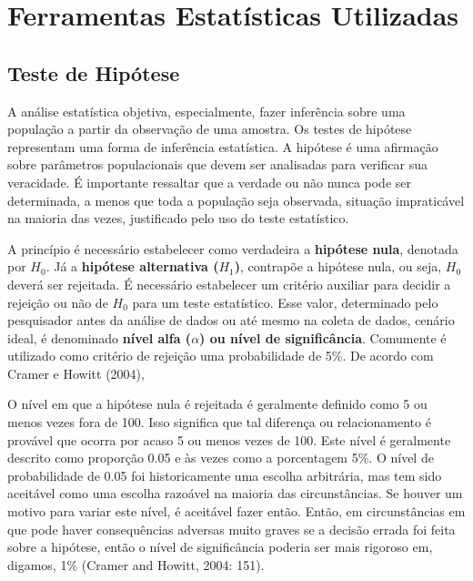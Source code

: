 \chapter{Ferramentas Estatísticas Utilizadas}
\section{Teste de Hipótese}
A análise estatística objetiva, especialmente, fazer inferência sobre uma população a partir da observação de uma amostra. Os testes de hipótese representam uma forma de inferência estatística. A hipótese é uma afirmação sobre parâmetros populacionais que devem ser analisadas para verificar sua veracidade. É importante ressaltar que a verdade ou não nunca pode ser determinada, a menos que toda a população seja observada, situação impraticável na maioria das vezes, justificado pelo uso do teste estatístico.  

A princípio é necessário estabelecer como verdadeira a \textbf{hipótese nula}, denotada por \textbf{$H_0$}. Já a \textbf{hipótese alternativa ($H_1$)}, contrapõe a hipótese nula, ou seja, $H_0$ deverá ser rejeitada. É necessário estabelecer um critério auxiliar para decidir a rejeição ou não de $H_0$ para um teste estatístico. Esse valor, determinado pelo pesquisador antes da análise de dados ou até mesmo na coleta de dados, cenário ideal, é denominado \textbf{nível alfa ($\alpha$) ou nível de significância}. Comumente é utilizado como critério de rejeição uma probabilidade de 5\%. De acordo com Cramer e Howitt (2004), 

\begin{citacao}
O nível em que a hipótese nula é rejeitada é geralmente definido como 5 ou menos vezes fora de 100. Isso significa que tal diferença ou relacionamento é provável que ocorra por acaso 5 ou menos vezes de 100. Este nível é geralmente descrito como proporção 0.05 e às vezes como a porcentagem 5\%. O nível de probabilidade de 0.05 foi historicamente uma escolha arbitrária, mas tem sido aceitável como uma escolha razoável na maioria das circunstâncias. Se houver um motivo para variar este nível, é aceitável fazer então. Então, em circunstâncias em que pode haver consequências adversas muito graves se a decisão errada foi feita sobre a hipótese, então o nível de significância poderia ser mais rigoroso em, digamos, 1\% (Cramer and Howitt, 2004: 151). 
\end{citacao}

